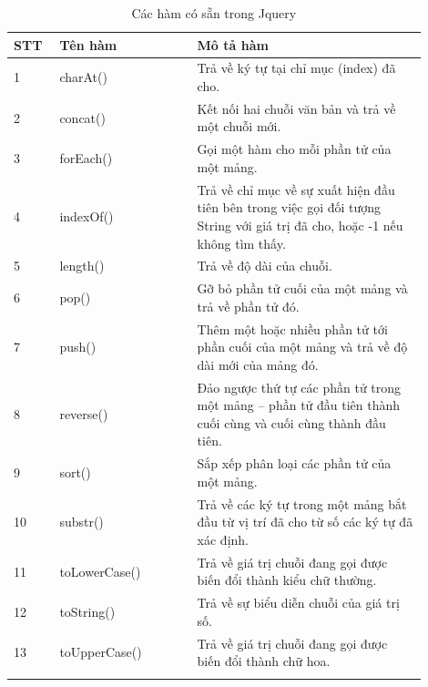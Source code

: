     \begin{longtable}{m{0.1\linewidth}  m{0.3\linewidth}  m{0.5\linewidth}}
    \caption{Các hàm có sẵn trong Jquery \cite{3}} \\ \hline
     	\textbf{STT} & \textbf{Tên hàm} & \textbf{Mô tả hàm} \\ \hline
     	1&charAt()&Trả về ký tự tại chỉ mục (index) đã cho. \\
		\hline
     	2&concat()&Kết nối hai chuỗi văn bản và trả về một chuỗi mới.\\
		\hline
     	3&forEach()&Gọi một hàm cho mỗi phần tử của một mảng.\\
     	\hline
     	4&indexOf()&Trả về chỉ mục về sự xuất hiện đầu tiên bên trong việc gọi đối tượng String với giá trị đã cho, hoặc -1 nếu không tìm thấy.\\
     	\hline
     	5&length()&Trả về độ dài của chuỗi.\\
     	\hline
     	6&pop()&Gỡ bỏ phần tử cuối của một mảng và trả về phần tử đó.\\
     	\hline
		7&push()&Thêm một hoặc nhiều phần tử tới phần cuối của một mảng và trả về độ dài mới của mảng đó.\\
		\hline
		8&reverse()&Đảo ngược thứ tự các phần tử trong một mảng – phần tử đầu tiên thành cuối cùng và cuối cùng thành đầu tiên.\\
		\hline
		9&sort()&Sắp xếp phân loại các phần tử của một mảng.\\
		\hline
		10&substr()&Trả về các ký tự trong một mảng bắt đầu từ vị trí đã cho từ số các ký tự đã xác định.\\
		\hline
		11&toLowerCase()&Trả về giá trị chuỗi đang gọi được biến đổi thành kiểu chữ thường.\\
		\hline
		12&toString()&Trả về sự biểu diễn chuỗi của giá trị số.\\
		\hline
		13&toUpperCase()&Trả về giá trị chuỗi đang gọi được biến đổi thành chữ hoa. \\ \hline
	\label{bang2_1}
    \end{longtable}
